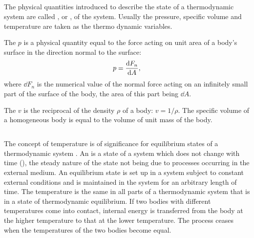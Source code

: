 \subsection{}\label{8.3.2} The physical quantities introduced to describe the state of a thermodynamic system are called , or , of the system. Usually the pres­sure, specific volume and temperature are taken as the thermo­ dynamic variables.

The  $p$ is a physical quantity equal to the force acting on unit area of a body's surface in the direction normal to the surface:
\begin{equation*}%
p = \dv{F_{n}}{A},
\end{equation*}
where $\dd F_{n}$ is the numerical value of the normal force acting on an infinitely small part of the surface of the body, the area of this part being $\dd A$.

The  $v$ is the reciprocal of the density $\rho$ of a body: $v = 1/\rho$. The specific volume of a homogeneous body is equal to the volume of unit mass of the body.

\subsection{}\label{8.3.3} The concept of temperature is of significance for equilibrium states of a thermodynamic system . An  is a state of a system which does not change with time (), the steady nature of the state not being due to processes occurring in the external medium. An equilibrium state is set up in a system subject to constant external conditions and is main­tained in the system for an arbitrary length of time. The tem­perature is the same in all parts of a thermodynamic system that is in a state of thermodynamic equilibrium. If two bodies with different temperatures come into contact, internal ener­gy  is transferred from the body at the higher temperature to that at the lower temperature. The process ceases when the temperatures of the two bodies become equal.

